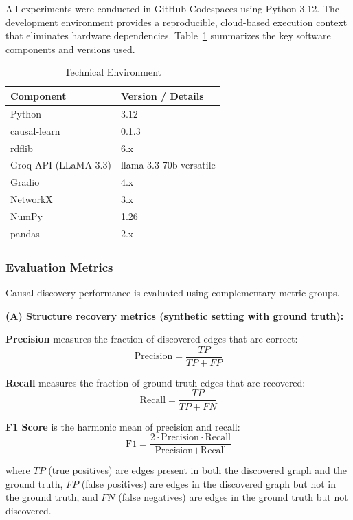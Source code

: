 \documentclass[a4paper,11pt,oneside]{article}
\begin{document}
All experiments were conducted in GitHub Codespaces using Python 3.12. The development environment provides a reproducible, cloud-based execution context that eliminates hardware dependencies. Table~\ref{tab:tech} summarizes the key software components and versions used.

\begin{table}[h]
\centering
\caption{Technical Environment}
\label{tab:tech}
\begin{tabular}{ll}
\toprule
\textbf{Component} & \textbf{Version / Details} \\
\midrule
Python & 3.12 \\
causal-learn & 0.1.3 \\
rdflib & 6.x \\
Groq API (LLaMA 3.3) & llama-3.3-70b-versatile \\
Gradio & 4.x \\
NetworkX & 3.x \\
NumPy & 1.26 \\
pandas & 2.x \\
\bottomrule
\end{tabular}
\end{table}

\subsubsection{Evaluation Metrics}

Causal discovery performance is evaluated using complementary metric groups.

\textbf{(A) Structure recovery metrics (synthetic setting with ground truth):}

\textbf{Precision} measures the fraction of discovered edges that are correct:
\begin{equation}
    \text{Precision} = \frac{TP}{TP + FP}
\end{equation}

\textbf{Recall} measures the fraction of ground truth edges that are recovered:
\begin{equation}
    \text{Recall} = \frac{TP}{TP + FN}
\end{equation}

\textbf{F1 Score} is the harmonic mean of precision and recall:
\begin{equation}
    \text{F1} = \frac{2 \cdot \text{Precision} \cdot \text{Recall}}{\text{Precision} + \text{Recall}}
\end{equation}

where $TP$ (true positives) are edges present in both the discovered graph and the ground truth, $FP$ (false positives) are edges in the discovered graph but not in the ground truth, and $FN$ (false negatives) are edges in the ground truth but not discovered.
\end{document}
